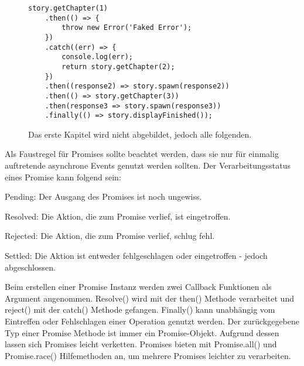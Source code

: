 \begin{figure}[H]
\begin{lstlisting}[basicstyle=\small]
story.getChapter(1)
    .then(() => {
        throw new Error('Faked Error');
    })
    .catch((err) => {
        console.log(err);
        return story.getChapter(2);
    })
    .then((response2) => story.spawn(response2))
    .then(() => story.getChapter(3))
    .then(response3 => story.spawn(response3))
    .finally(() => story.displayFinished());
\end{lstlisting}
\caption{Das erste Kapitel wird nicht abgebildet, jedoch alle folgenden.}
\end{figure}

\noindent
Als Faustregel für Promises sollte beachtet werden, dass sie nur für einmalig auftretende asynchrone Events genutzt werden sollten. Der Verarbeitungsstatus eines Promise kann folgend sein:

\begin{description} 
\item Pending: Der Ausgang des Promises ist noch ungewiss.
\item Resolved: Die Aktion, die zum Promise verlief, ist eingetroffen.
\item Rejected: Die Aktion, die zum Promise verlief, schlug fehl.
\item Settled: Die Aktion ist entweder fehlgeschlagen oder eingetroffen - jedoch abgeschlossen.
\end{description}

\noindent
Beim erstellen einer Promise Instanz werden zwei Callback Funktionen als Argument angenommen. Resolve() wird mit der then() Methode verarbeitet und reject() mit der catch() Methode gefangen. Finally() kann unabhängig vom Eintreffen oder Fehlschlagen einer Operation genutzt werden. Der zurückgegebene Typ einer Promise Methode ist immer ein Promise-Objekt. Aufgrund dessen lassen sich Promises leicht verketten. Promises bieten mit Promise.all() und Promise.race() Hilfemethoden an, um mehrere Promises leichter zu verarbeiten.




